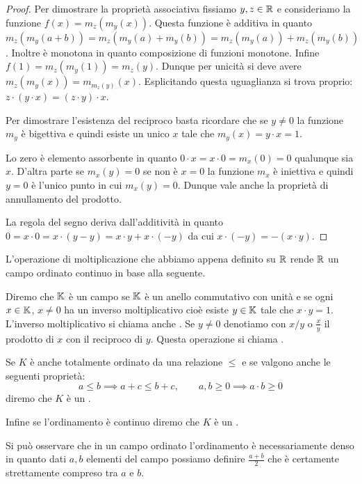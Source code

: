 \begin{proof}
Per dimostrare la proprietà associativa fissiamo $y,z\in {\mathbb R}$
e consideriamo la funzione $f(x) = m_z(m_y(x))$.
Questa funzione è additiva in quanto $m_z(m_y(a+b)) = m_z(m_y(a)+m_y(b))
=m_z(m_y(a)) + m_z(m_y(b))$. 
Inoltre è monotona in quanto composizione di funzioni monotone.
Infine $f(1) = m_z(m_y(1)) = m_z(y)$. 
Dunque per unicità si deve avere $m_z(m_y(x)) = m_{m_z(y)}(x)$.
Esplicitando questa uguaglianza si trova proprio: $z\cdot(y\cdot x) = (z\cdot y)\cdot x$.

Per dimostrare l'esistenza del reciproco basta ricordare che 
se $y\neq 0$ la funzione $m_y$ è bigettiva e quindi 
esiste un unico $x$ tale che $m_y(x)=y\cdot x = 1$.

Lo zero è elemento assorbente in quanto $0 \cdot x = x\cdot 0 = m_x(0)=0$
qualunque sia $x$.
D'altra parte se $m_x(y) = 0$ se non è $x=0$ la funzione $m_x$ è iniettiva 
e quindi $y=0$ è l'unico punto in cui $m_x(y)=0$. 
Dunque vale anche la proprietà di annullamento del prodotto.

La regola del segno deriva dall'additività in quanto 
$0 = x\cdot 0 = x\cdot (y-y) = x\cdot y + x \cdot (-y)$
da cui $x\cdot (-y) = -(x\cdot y)$.
\end{proof}

L'operazione di moltiplicazione che abbiamo appena definito su ${\mathbb R}$ 
rende ${\mathbb R}$ un campo ordinato continuo in base alla seguente.

\begin{definition}[campo]
  Diremo che ${\mathbb K}$ è un campo se ${\mathbb K}$ è un anello commutativo con unità 
  e se ogni $x\in {\mathbb K}$, $x\neq 0$ ha un inverso moltiplicativo cioè 
  esiste $y\in {\mathbb K}$ tale che $x\cdot y = 1$.
  L'inverso moltiplicativo si chiama anche .
  Se $y\neq 0$ denotiamo con $x/y$ o $\frac x y$ il prodotto 
  di $x$ con il reciproco di $y$. 
  Questa operazione si chiama .

  Se $K$ è anche totalmente ordinato da una relazione $\le$
  e se valgono anche le seguenti proprietà:
  \[
  a \le b \implies a+c\le b+c, \qquad 
  a,b\ge 0 \implies a\cdot b \ge 0
  \]
  diremo che $K$ è un .

  Infine se l'ordinamento è continuo diremo che $K$ 
  è un .
\end{definition}

Si può osservare che in un campo ordinato l'ordinamento 
è necessariamente denso in quanto dati $a,b$ elementi 
del campo possiamo definire $\frac{a+b}{2}$ che è certamente 
strettamente compreso tra $a$ e $b$.

